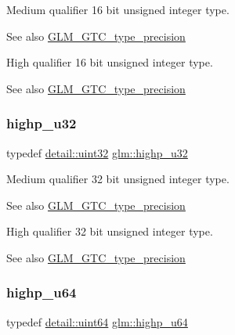 Medium qualifier 16 bit unsigned integer type. \begin{DoxySeeAlso}{See also}
\mbox{\hyperlink{group__gtc__type__precision}{G\+L\+M\+\_\+\+G\+T\+C\+\_\+type\+\_\+precision}}
\end{DoxySeeAlso}
High qualifier 16 bit unsigned integer type. \begin{DoxySeeAlso}{See also}
\mbox{\hyperlink{group__gtc__type__precision}{G\+L\+M\+\_\+\+G\+T\+C\+\_\+type\+\_\+precision}} 
\end{DoxySeeAlso}
\mbox{\label{group__gtc__type__precision_gae8e8a2c712653891a03c171795286ac5}} 
\subsubsection{\texorpdfstring{highp\+\_\+u32}{highp\_u32}}
{\footnotesize\ttfamily typedef \mbox{\hyperlink{namespaceglm_1_1detail_ade6cfbf377022aaa391af8cd50489222}{detail\+::uint32}} \mbox{\hyperlink{group__gtc__type__precision_gae8e8a2c712653891a03c171795286ac5}{glm\+::highp\+\_\+u32}}}

Medium qualifier 32 bit unsigned integer type. \begin{DoxySeeAlso}{See also}
\mbox{\hyperlink{group__gtc__type__precision}{G\+L\+M\+\_\+\+G\+T\+C\+\_\+type\+\_\+precision}}
\end{DoxySeeAlso}
High qualifier 32 bit unsigned integer type. \begin{DoxySeeAlso}{See also}
\mbox{\hyperlink{group__gtc__type__precision}{G\+L\+M\+\_\+\+G\+T\+C\+\_\+type\+\_\+precision}} 
\end{DoxySeeAlso}
\mbox{\label{group__gtc__type__precision_ga6006ea883d3c0491791650b2fb84de39}} 
\subsubsection{\texorpdfstring{highp\+\_\+u64}{highp\_u64}}
{\footnotesize\ttfamily typedef \mbox{\hyperlink{namespaceglm_1_1detail_adec4b19bf4982125e122db2fe03c5810}{detail\+::uint64}} \mbox{\hyperlink{group__gtc__type__precision_ga6006ea883d3c0491791650b2fb84de39}{glm\+::highp\+\_\+u64}}}

